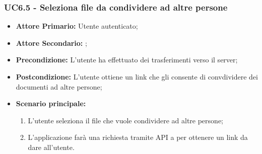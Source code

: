 \subsubsection{UC6.5 - Seleziona file da condividere ad altre persone}
\label{UC6.5}
\begin{itemize}
\item \textbf{Attore Primario:} Utente autenticato;
\item \textbf{Attore Secondario:} ;
\item \textbf{Precondizione:} L'utente ha effettuato dei trasferimenti verso il server;
\item \textbf{Postcondizione:} L'utente ottiene un link che gli consente di convdividere dei documenti ad altre persone;
\item \textbf{Scenario principale:}
    \begin{enumerate}
    \item L'utente seleziona il file che vuole condividere ad altre persone;
    \item L'applicazione farà una richiesta tramite API a  per ottenere un link da dare all'utente.
    \end{enumerate}
\end{itemize}